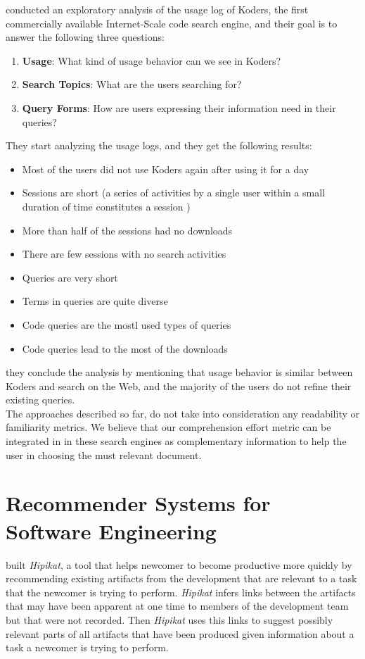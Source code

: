 \documentclass[12pt,mscthesis]{usiinfthesis}
\begin{document}
	
	\citet{Bajracharya2012} conducted an exploratory analysis of the usage log of Koders, the first commercially available Internet-Scale code search engine, and their goal is to answer the following three questions:\\
	\begin{enumerate}
	\item \textbf{Usage}: What kind of usage behavior can we see in Koders?
	\item \textbf{Search Topics}: What are the users searching for?
	\item \textbf{Query Forms}: How are users expressing their information need in their queries?
	\end{enumerate}
	They start analyzing the usage logs, and they get the following results: 
	\begin{itemize}
	\item Most of the users did not use Koders again after using it for a day
	\item Sessions are short (a series of activities by a single user within a small duration of time constitutes a session )
	\item More than half of the sessions had no downloads
	\item There are few sessions with no search activities
	\item Queries are very short
	\item Terms in queries are quite diverse
	\item Code queries are the mostl used types of queries
	\item Code queries lead to the most of the downloads
	\end{itemize}
	they conclude the analysis by mentioning that usage behavior is similar between Koders and search on the Web, and the majority of the users do not refine their existing queries.\\

	The approaches described so far, do not take into consideration any readability or familiarity metrics. We believe that our comprehension effort metric can be integrated in in these search engines as complementary information to help the user in choosing the must relevant document.
	
	\section{Recommender Systems for Software Engineering}

	\citet{Cubranic:2003:HRP:776816.776866} built \emph{Hipikat}, a tool that helps newcomer to become productive more quickly by recommending existing artifacts from the development that are relevant to a task that the newcomer is trying to perform. \emph{Hipikat} infers links between the artifacts that may have been apparent at one time to members of the development team but that were not recorded. Then \emph{Hipikat} uses this links to suggest possibly relevant parts of all artifacts that have been produced given information about a task a newcomer is trying to perform.
\end{document}
